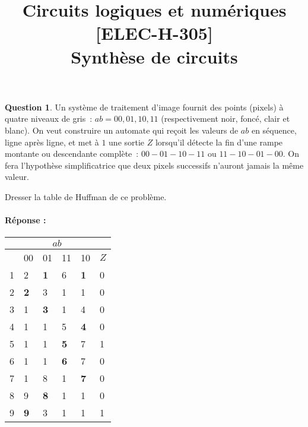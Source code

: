 \documentclass[11pt,a4paper]{article}
\date{}
\title{\vspace{-2cm}Circuits logiques et numériques [ELEC-H-305] \\  \tpnumber Synthèse de circuits \ifthenelse{\boolean{corrige}}{-- Corrigé}{} \\ \small{\version}}
\theoremstyle{definition}%
\newtheorem{Q}{Question}[] %
\newcommand{\reponse}[1]{%
	\ifthenelse {\boolean{corrige}} {\paragraph{Réponse :} \color{darkblue}   #1\color{black}} {}
 }
\begin{document}
\maketitle
\vspace*{-1cm}



\begin{Q}
Un système de traitement d'image fournit des points (pixels) à quatre niveaux de gris~: $ab = 00, 01, 10, 11$ (respectivement noir, foncé, clair et blanc).
On veut construire un automate qui reçoit les valeurs de $ab$ en séquence, ligne après ligne, et met à $1$ une sortie $Z$ lorsqu'il détecte la fin d'une rampe montante ou descendante complète~: $00-01-10-11$ ou $11-10-01-00$.
On fera l'hypothèse simplificatrice que deux pixels successifs n'auront jamais la même valeur.

Dresser la table de Huffman de ce problème.

\reponse{
	\begin{center}
		\begin{tabular}{|l|l|l|l|l|l|} \hline
			& \multicolumn{4}{c}{$ab$} & \\ \hline
			& 00 & 01 & 11 & 10 & $Z$ \\ \hline
			1 & 2 & \textbf{1} & 6 & \textbf{1} & 0 \\ \hline
			2 & \textbf{2} & 3 & 1 & 1 & 0 \\ \hline
			3 & 1 & \textbf{3} & 1 & 4 & 0 \\ \hline
			4 & 1 & 1 & 5 & \textbf{4} & 0 \\ \hline
			5 & 1 & 1 & \textbf{5} & 7 & 1 \\ \hline
			6 & 1 & 1 & \textbf{6} & 7 & 0 \\ \hline
			7 & 1 & 8 & 1 & \textbf{7} & 0 \\ \hline
			8 & 9 & \textbf{8} & 1 & 1 & 0 \\ \hline
			9 & \textbf{9} & 3 & 1 & 1 & 1 \\ \hline
		\end{tabular}
	\end{center}
}
\end{Q}
\end{document}
